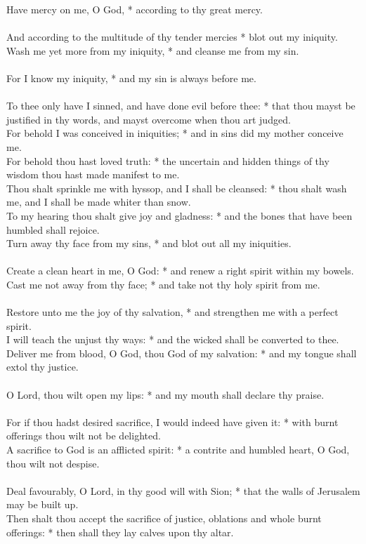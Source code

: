 \begin{Parallel}[v]{\colw}{\colx}
{{}}
{\vern
{\noindent
Have mercy on me, O God, * according to thy great mercy.\\ \\
And according to the multitude of thy tender mercies * blot out my iniquity.\\
Wash me yet more from my iniquity, * and cleanse me from my sin.\\ \\
For I know my iniquity, * and my sin is always before me.\\ \\
To thee only have I sinned, and have done evil before thee: * that thou mayst be justified in thy words, and mayst overcome when thou art judged.\\
For behold I was conceived in iniquities; * and in sins did my mother conceive me.\\
For behold thou hast loved truth: * the uncertain and hidden things of thy wisdom thou hast made manifest to me.\\
Thou shalt sprinkle me with hyssop, and I shall be cleansed: * thou shalt wash me, and I shall be made whiter than snow.\\
To my hearing thou shalt give joy and gladness: * and the bones that have been humbled shall rejoice.\\
Turn away thy face from my sins, * and blot out all my iniquities.\\ \\
Create a clean heart in me, O God: * and renew a right spirit within my bowels.\\
Cast me not away from thy face; * and take not thy holy spirit from me.\\ \\
Restore unto me the joy of thy salvation, * and strengthen me with a perfect spirit.\\
I will teach the unjust thy ways: * and the wicked shall be converted to thee.\\
Deliver me from blood, O God, thou God of my salvation: * and my tongue shall extol thy justice.\\ \\
O Lord, thou wilt open my lips: * and my mouth shall declare thy praise.\\ \\
For if thou hadst desired sacrifice, I would indeed have given it: * with burnt offerings thou wilt not be delighted.\\
A sacrifice to God is an afflicted spirit: * a contrite and humbled heart, O God, thou wilt not despise.\\ \\
Deal favourably, O Lord, in thy good will with Sion; * that the walls of Jerusalem may be built up.\\
Then shalt thou accept the sacrifice of justice, oblations and whole burnt offerings: * then shall they lay calves upon thy altar.}}

\end{Parallel}



